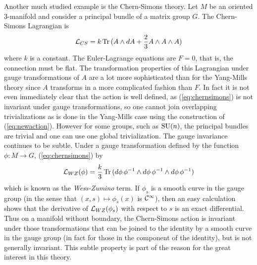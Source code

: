 \documentclass[12pt,titlepage]{article}
\def\cC{{\cal C}}
\def\cL{{\cal L}}
\def\Tr{\hbox{Tr}}
\def\SU{\hbox{SU}}
\begin{document}
Another much studied example is the Chern-Simons theory. Let \(M\) be an 
oriented
\(3\)-manifold and consider a principal bundle of a matrix group \(G\).
The Chern-Simons Lagrangian is
\begin{equation}\label{eq:chernsimons}%
\cL_{CS} = k\,\Tr\,(A \wedge dA + \frac{2}{3}A\wedge A
\wedge A)
\end{equation}%
where \(k\) is a constant. 
The Euler-Lagrange equations are \(F=0\), that
is, the connection must be flat.  
The transformation properties of this Lagrangian under gauge transformations 
of \(A\) are a lot more sophisticated than for the  Yang-Mills theory since 
\(A\)
transforms in a more complicated fashion than \(F\). In fact it is not even 
immediately clear that the action is well defined, as 
(\ref{eq:chernsimons}) 
is not invariant under gauge transformations, so one cannot join
overlapping 
trivializations as is done in the Yang-Mills case using the 
construction of (\ref{eq:newaction}).  However for some 
groups, such as 
\(\SU(n)\), the principal bundles are trivial and one can use 
one global trivialization. The gauge invariance continues to be subtle.
Under a gauge transformation defined  by the function \(\phi:M\to G\), 
(\ref{eq:chernsimons})  by
\[%
\cL_{WZ}(\phi)=\frac{k}{3}\,\Tr\,(d\phi\,\phi^{-1}\wedge 
d\phi\,\phi^{-1}\wedge d\phi\,\phi^{-1})
\]%
which is known as the {\em Wess-Zumino\/}
%
term. 
If \(\phi_s\) is a smooth curve in the gauge
group (in the sense that \((x,s)\mapsto \phi_s(x)\) is \(\cC^\infty\)), 
then an easy calculation shows that the derivative of \(\cL_{WZ}(\phi_s)\) 
with respect to \(s\) is an exact differential. 
Thus on a manifold without boundary, 
the Chern-Simons action 
is invariant under 
those transformations that can be joined to the identity by a 
smooth curve in 
the gauge group (in fact for those in the component of the identity), 
but is  not generally  invariant. This subtle 
property is part 
of the reason for the great interest in this theory.
\end{document}
